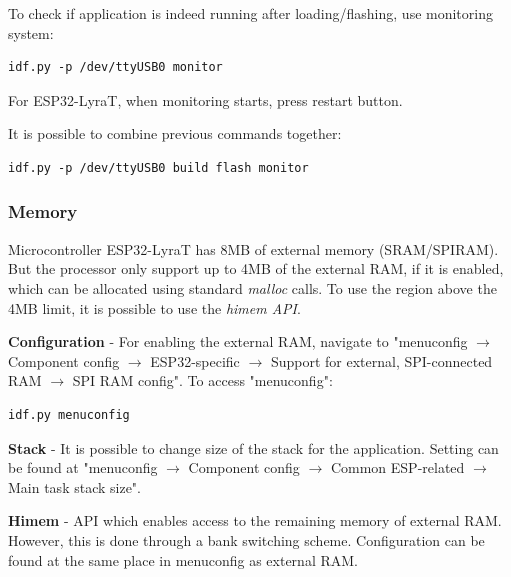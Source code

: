 \documentclass[thesis=M,english]{FITthesis}[2019/12/23]
\begin{document}
\bigskip
\noindent
To check if application is indeed running after loading/flashing, use monitoring system:
\begin{lstlisting}[frame=single]
idf.py -p /dev/ttyUSB0 monitor
\end{lstlisting}
For ESP32-LyraT, when monitoring starts, press restart button.

\bigskip
\noindent
It is possible to combine previous commands together:
\begin{lstlisting}[frame=single]
idf.py -p /dev/ttyUSB0 build flash monitor
\end{lstlisting}

\subsubsection{Memory} \label{esp-memory}
Microcontroller ESP32-LyraT has 8MB of external memory (SRAM/SPIRAM). But the processor only support up to 4MB of the external RAM, if it is enabled, which can be allocated using standard \textit{malloc} calls. To use the region above the 4MB limit, it is possible to use the \textit{himem API}.

\bigskip
\noindent
\textbf{Configuration} - For enabling the external RAM, navigate to "menuconfig $\rightarrow$ Component config $\rightarrow$ ESP32-specific $\rightarrow$ Support for external, SPI-connected RAM $\rightarrow$ SPI RAM config". To access "menuconfig":
\begin{lstlisting}[frame=single]
idf.py menuconfig
\end{lstlisting}

\bigskip
\noindent
\textbf{Stack} - It is possible to change size of the stack for the application. Setting can be found at "menuconfig $\rightarrow$ Component config $\rightarrow$ Common ESP-related $\rightarrow$ Main task stack size".

\bigskip
\noindent
\textbf{Himem} - API which enables access to the remaining memory of external RAM. However, this is done through a bank switching scheme. Configuration can be found at the same place in menuconfig as external RAM.

\end{document}
